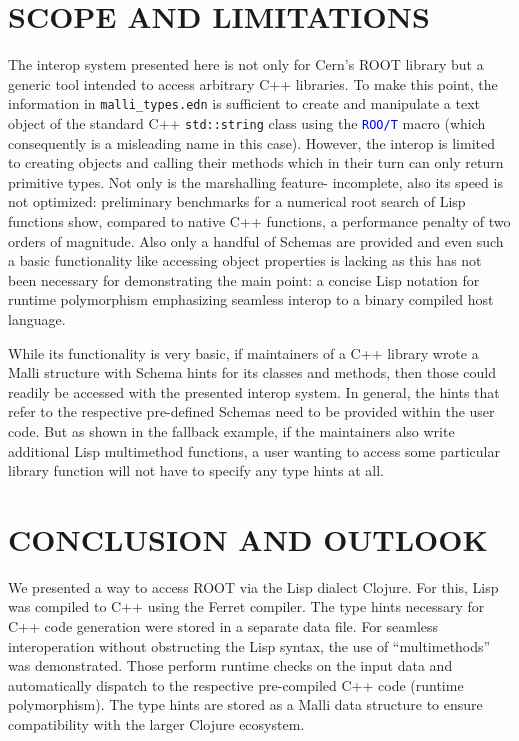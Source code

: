 \documentclass{IEEEcsmag}
\begin{document}
\section{SCOPE AND LIMITATIONS}
The interop system presented here is not only for Cern’s ROOT library but a generic tool intended to access arbitrary C++ libraries. To make this point, the information in \texttt{malli\_types.edn} is sufficient to create and manipulate a text object of the standard C++ \texttt{std::string} class using the \texttt{\textcolor{blue}{ROO/T}} macro (which consequently is a misleading name in this case). However, the interop is limited to creating objects and calling their methods which in their turn can only return primitive types. Not only is the marshalling feature- incomplete, also its speed is not optimized: preliminary benchmarks for a numerical root search of Lisp functions show, compared to native C++ functions, a performance penalty of two orders of magnitude. Also only a handful of Schemas are provided and even such a basic functionality like accessing object properties is lacking as this has not been necessary for demonstrating the main point: a concise Lisp notation for runtime polymorphism emphasizing seamless interop to a binary compiled host language.

While its functionality is very basic, if maintainers of a C++ library wrote a Malli structure with Schema hints for its classes and methods, then those could readily be accessed with the presented interop system. In general, the hints that refer to the respective pre-defined Schemas need to be provided within the user code. But as shown in the fallback example, if the maintainers also write additional Lisp multimethod functions, a user wanting to access some particular library function will not have to specify any type hints at all.\vspace*{-5pt}

\section{CONCLUSION AND OUTLOOK}
We presented a way to access ROOT via the Lisp dialect Clojure. For this, Lisp was compiled to C++ using the Ferret compiler. The type hints necessary for C++ code generation were stored in a separate data file. For seamless interoperation without obstructing the Lisp syntax, the use of “multimethods” was demonstrated. Those perform runtime checks on the input data and automatically dispatch to the respective pre-compiled C++ code (runtime polymorphism). The type hints are stored as a Malli data structure to ensure compatibility with the larger Clojure ecosystem.
\end{document}
